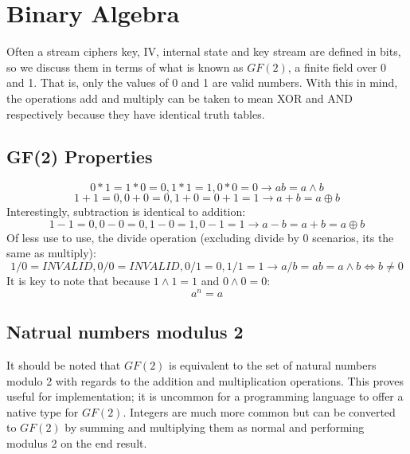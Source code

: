\documentclass{report}
\let\Oldsection\section
\renewcommand{\section}{\FloatBarrier\Oldsection}
\let\Oldsubsection\subsection
\renewcommand{\subsection}{\FloatBarrier\Oldsubsection}
\begin{document}
\section{Binary Algebra}
Often a stream ciphers key, IV, internal state and key stream are defined in bits, so we discuss them in terms of what is known as $\mathit{GF(2)}$, a finite field over 0 and 1. That is, only the values of 0 and 1 are valid numbers. With this in mind, the operations add and multiply can be taken to mean XOR and AND respectively because they have identical truth tables.

\subsection{GF(2) Properties}
\begin{equation} \label{eq:GFtimes}
0*1 = 1*0=0, 1*1=1, 0*0=0 \to ab = a \land b
\end{equation}
\begin{equation} \label{eq:GFadd}
1+1=0, 0+0=0, 1+0=0+1=1 \to a+b = a \oplus b
\end{equation}
Interestingly, subtraction is identical to addition:
\begin{equation} \label{eq:GFminus}
1-1=0, 0-0=0, 1-0=1, 0-1=1 \to a-b = a+b = a \oplus b
\end{equation}
Of less use to use, the divide operation (excluding divide by 0 scenarios, its the same as multiply):
\begin{equation} \label{eq:GFdivide}
1/0=\mathit{INVALID}, 0/0=\mathit{INVALID}, 0/1=0, 1/1=1 \to a/b = ab = a \land b \iff b \neq 0
\end{equation}
It is key to note that because $1\land1=1$ and $0\land0 = 0$:
\begin{equation} \label{eq:GFpowers}
a^n = a
\end{equation}

\subsection{Natrual numbers modulus 2}
It should be noted that $\mathit{GF(2)}$ is equivalent to the set of natural numbers modulo 2 with regards to the addition and multiplication operations. This proves useful for implementation; it is uncommon for a programming language to offer a native type for $\mathit{GF(2)}$. Integers are much more common but can be converted to $\mathit{GF(2)}$ by summing and multiplying them as normal and performing modulus 2 on the end result.
\end{document}
